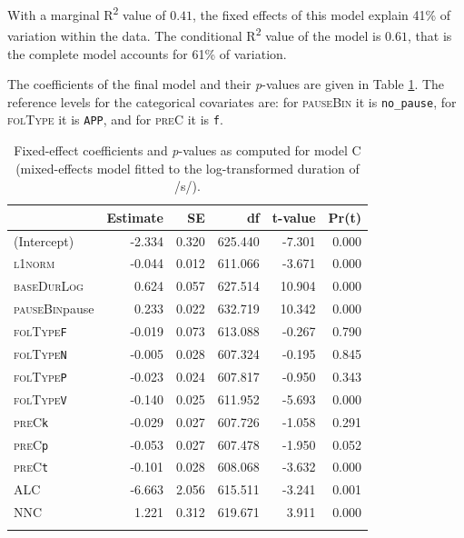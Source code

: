With a marginal R\textsuperscript{2} value of $0.41$, the fixed effects of this model explain 41\% of variation within the data. The conditional R\textsuperscript{2} value of the model is $0.61$, that is the complete model accounts for 61\% of variation.

The coefficients of the final model and their \textit{p}-values are given in Table \ref{tab:5.11}. The reference levels for the categorical covariates are: for \textsc{pauseBin} it is \texttt{no\_pause}, for \textsc{folType} it is \texttt{APP}, and for \textsc{preC} it is \texttt{f}.

\begin{table}\fontsize{10}{11}
\caption{Fixed-effect coefficients and \textit{p}-values as computed for model C (mixed-effects model fitted to the log-transformed duration of /s/).}
\label{tab:5.11}
\centering
\begin{tabular}{lrrrrr} 
\lsptoprule
~             & Estimate & SE    & df      & t-value & Pr(\textbar{}t\textbar{})  \\ 
\midrule
(Intercept)   & -2.334   & 0.320 & 625.440 & -7.301  & 0.000                      \\
\textsc{l1norm}        & -0.044   & 0.012 & 611.066 & -3.671  & 0.000                      \\
\textsc{baseDurLog}    & 0.624    & 0.057 & 627.514 & 10.904  & 0.000                      \\
\textsc{pauseBin}pause & 0.233    & 0.022 & 632.719 & 10.342  & 0.000                      \\
\textsc{folType}\texttt{F}      & -0.019   & 0.073 & 613.088 & -0.267  & 0.790                      \\
\textsc{folType}\texttt{N}      & -0.005   & 0.028 & 607.324 & -0.195  & 0.845                      \\
\textsc{folType}\texttt{P}      & -0.023   & 0.024 & 607.817 & -0.950  & 0.343                      \\
\textsc{folType}\texttt{V}      & -0.140   & 0.025 & 611.952 & -5.693  & 0.000                      \\
\textsc{preC}\texttt{k}         & -0.029   & 0.027 & 607.726 & -1.058  & 0.291                      \\
\textsc{preC}\texttt{p}         & -0.053   & 0.027 & 607.478 & -1.950  & 0.052                      \\
\textsc{preC}\texttt{t}         & -0.101   & 0.028 & 608.068 & -3.632  & 0.000                      \\
\textsc{ALC}           & -6.663   & 2.056 & 615.511 & -3.241  & 0.001                      \\
\textsc{NNC}           & 1.221    & 0.312 & 619.671 & 3.911   & 0.000                      \\
\lspbottomrule
\end{tabular}
\end{table}

